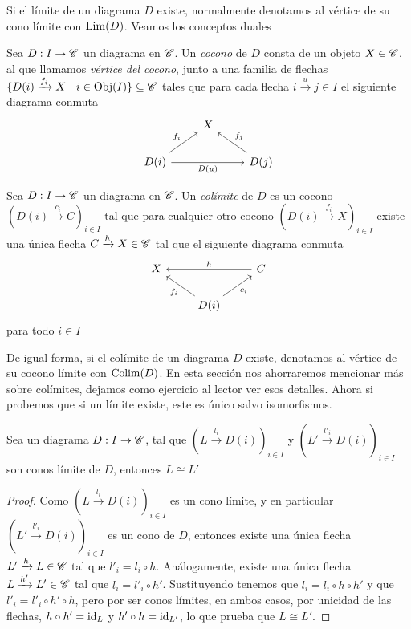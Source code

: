 \documentclass{comunicaciones}
\begin{document}
Si el límite de un diagrama $D$ existe, normalmente denotamos al vértice de su cono límite con $\mathrm{Lim}(D)$. Veamos los conceptos duales

\begin{dfn}[Cocono]
    Sea $D:I\to\mathscr C$ un diagrama en $\mathscr C$. Un \emph{cocono} de $D$ consta de un objeto $X\in\mathscr C$, al que llamamos \emph{vértice del cocono}, junto a una familia
    de flechas $\{D(i)\xrightarrow{f_i}X \ |\ i\in\Obj(I)\}\subseteq\C$ tales que para cada flecha $i\xrightarrow{u}j\in I$ el siguiente diagrama conmuta
    \[\begin{tikzcd}
        & X \\
        {D(i)} && {D(j)}
        \arrow["{f_i}", from=2-1, to=1-2]
        \arrow["{f_j}"', from=2-3, to=1-2]
        \arrow["{D(u)}"', from=2-1, to=2-3]
    \end{tikzcd}\]
\end{dfn}

\begin{dfn}[Colímite]
    Sea $D:I\to\mathscr C$ un diagrama en $\mathscr C$. Un \emph{colímite} de $D$ es un cocono $(D(i)\xrightarrow{c_i}C)_{i\in I}$ tal que para cualquier otro cocono $(D(i)\xrightarrow{f_i}X)_{i\in I}$
    existe una única flecha $C\xrightarrow{h}X\in\mathscr C$ tal que el siguiente diagrama conmuta
    \[\begin{tikzcd}
        X && C \\
        & {D(i)}
        \arrow["h"', from=1-3, to=1-1]
        \arrow["{f_i}", from=2-2, to=1-1]
        \arrow["{c_i}"', from=2-2, to=1-3]
    \end{tikzcd}\] para todo $i\in I$
\end{dfn}

De igual forma, si el colímite de un diagrama $D$ existe, denotamos al vértice de su cocono límite con $\mathrm{Colim}(D)$. En esta sección nos ahorraremos mencionar
más sobre colímites, dejamos como ejercicio al lector ver esos detalles. Ahora si probemos que si un límite existe, este es único salvo isomorfismos.

\begin{lem}
    Sea un diagrama $D:I\to\mathscr C$, tal que $(L\xrightarrow{l_i}D(i))_{i\in I}$ y $(L'\xrightarrow{l'_i}D(i))_{i\in I}$ son conos límite de $D$,
    entonces $L\cong L'$
\end{lem}
\begin{proof}
    Como $(L\xrightarrow{l_i}D(i))_{i\in I}$ es un cono límite, y en particular $(L'\xrightarrow{l'_i}D(i))_{i\in I}$ es un cono de $D$, 
    entonces existe una única flecha $L'\xrightarrow{h}L\in\mathscr C$ tal que $l'_i=l_i\circ h$. Análogamente, existe una única flecha 
    $L\xrightarrow{h'}L'\in\mathscr C$ tal que $l_i=l'_i\circ h'$. Sustituyendo tenemos que $l_i=l_i\circ h\circ h'$ y que $l'_i=l'_i\circ h'\circ h$,
    pero por ser conos límites, en ambos casos, por unicidad de las flechas, $h\circ h'=\mathrm{id}_L$ y $h'\circ h=\mathrm{id}_{L'}$, lo que prueba que
    $L\cong L'$.
\end{proof}
\end{document}
